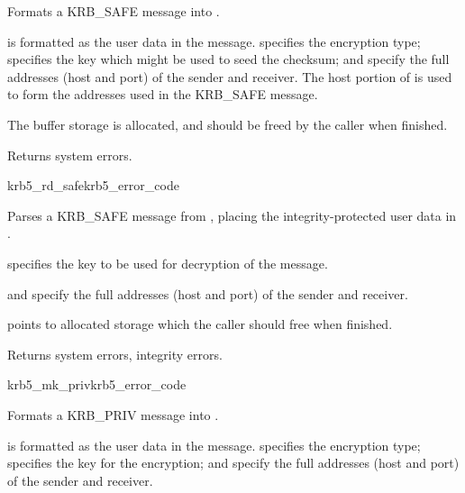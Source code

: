 Formats a KRB_SAFE message into .

 is formatted as the user data in the message.
 specifies the encryption type; 
specifies the key which might be used to seed the checksum;
 and  specify the full
addresses (host and port) of the sender and receiver.  The host portion
of  is used to form the addresses used in the
KRB_SAFE message.

The  buffer storage is allocated, and should be freed by the
caller when finished.

Returns system errors.

\begin{funcdecl}{krb5_rd_safe}{krb5_error_code}{\funcin}
\funcout
{}
\end{funcdecl}

Parses a KRB_SAFE message from , placing the
integrity-protected user data in .

 specifies the key to be used for decryption of the message.
 
 and  specify the full
addresses (host and port) of the sender and receiver.

 points to allocated storage which the caller should
free when finished.

Returns system errors, integrity errors.

\begin{funcdecl}{krb5_mk_priv}{krb5_error_code}{\funcin}
\funcout
{}
\end{funcdecl}

Formats a KRB_PRIV message into .

 is formatted as the user data in the message.
 specifies the encryption type; 
specifies the key for the encryption;  and
 specify the full addresses (host and port) of the
sender and receiver.

